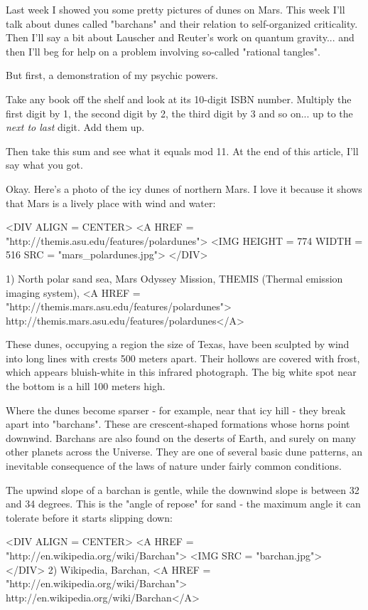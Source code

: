 

Last week I showed you some pretty pictures of dunes on Mars.  
This week I'll talk about dunes called "barchans" and their relation
to self-organized criticality.  Then I'll say a bit about Lauscher
and Reuter's work on quantum gravity... and then I'll beg for help 
on a problem involving so-called "rational tangles".

But first, a demonstration of my psychic powers.  

Take any book off the shelf and look at its 10-digit ISBN number.  
Multiply the first digit by 1, the second digit by 2, the third 
digit by 3 and so on... up to the \emph{next to last} digit.   Add them up.  

Then take this sum and see what it equals mod 11.  At the end of 
this article, I'll say what you got.

Okay.  Here's a photo of the icy dunes of northern Mars.  I love it
because it shows that Mars is a lively place with wind and water:

<DIV ALIGN = CENTER>
<A HREF = "http://themis.asu.edu/features/polardunes"> 
<IMG HEIGHT = 774 WIDTH = 516 SRC = "mars_polardunes.jpg">
</DIV>

1) North polar sand sea, Mars Odyssey Mission, THEMIS (Thermal 
emission imaging system), 
<A HREF = "http://themis.mars.asu.edu/features/polardunes">
http://themis.mars.asu.edu/features/polardunes</A>

These dunes, occupying a region the size of Texas, have been sculpted by 
wind into long lines with crests 500 meters apart.  Their hollows are 
covered with frost, which appears bluish-white in this infrared photograph.
The big white spot near the bottom is a hill 100 meters high.  

Where the dunes become sparser - for example, near that icy hill - they 
break apart into "barchans".  These are crescent-shaped formations 
whose horns point downwind.  Barchans are also found on the deserts of 
Earth, and surely on many other planets across the Universe.  They are 
one of several basic dune patterns, an inevitable consequence of the 
laws of nature under fairly common conditions.

The upwind slope of a barchan is gentle, while the downwind slope is 
between 32 and 34 degrees.  
This is the "angle of repose" for sand - the 
maximum angle it can tolerate before it starts slipping down:

<DIV ALIGN = CENTER>
<A HREF = "http://en.wikipedia.org/wiki/Barchan">
<IMG SRC = "barchan.jpg">
</DIV>
2) Wikipedia, Barchan, 
<A HREF = "http://en.wikipedia.org/wiki/Barchan">
http://en.wikipedia.org/wiki/Barchan</A>

